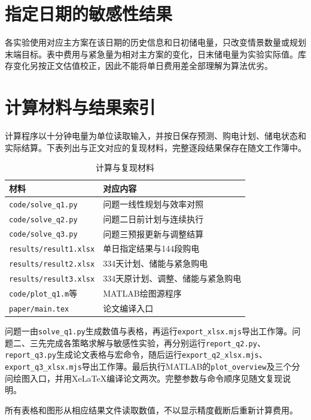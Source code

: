 \section{指定日期的敏感性结果}\label{app:sensitivity}
各实验使用对应主方案在该日期的历史信息和日初储电量，只改变情景数量或规划末端目标。表中费用与紧急量为相对主方案的变化，日末储电量为实验实际值。库存变化另按正文估值校正，因此不能将单日费用差全部理解为算法优劣。
\begin{table}[htbp]\centering\scriptsize
\caption{问题二的同起点敏感性比较}\label{tab:q2sensitivity}
\resizebox{\textwidth}{!}{}
\end{table}
\begin{table}[htbp]\centering\scriptsize
\caption{问题三的同起点敏感性比较}\label{tab:q3sensitivity}
\resizebox{\textwidth}{!}{}
\end{table}

\clearpage
\section{计算材料与结果索引}
计算程序以十分钟电量为单位读取输入，并按日保存预测、购电计划、储电状态和实际结算。下表列出与正文对应的复现材料，完整逐段结果保存在随文工作簿中。
\begin{table}[htbp]\centering\small
\caption{计算与复现材料}
\begin{tabular}{ll}\toprule
材料 & 对应内容\\\midrule
\texttt{code/solve\_q1.py} & 问题一线性规划与效率对照\\
\texttt{code/solve\_q2.py} & 问题二日前计划与连续执行\\
\texttt{code/solve\_q3.py} & 问题三预报更新与调整结算\\
\texttt{results/result1.xlsx} & 单日指定结果与144段购电\\
\texttt{results/result2.xlsx} & 334天计划、储能与紧急购电\\
\texttt{results/result3.xlsx} & 334天原计划、调整、储能与紧急购电\\
\texttt{code/plot\_q1.m}等 & MATLAB绘图源程序\\
\texttt{paper/main.tex} & 论文编译入口\\
\bottomrule\end{tabular}
\end{table}
问题一由\texttt{solve\_q1.py}生成数值与表格，再运行\texttt{export\_xlsx.mjs}导出工作簿。问题二、三先完成各策略求解与敏感性实验，再分别运行\texttt{report\_q2.py}、\texttt{report\_q3.py}生成论文表格与宏命令，随后运行\texttt{export\_q2\_xlsx.mjs}、\texttt{export\_q3\_xlsx.mjs}导出工作簿。最后执行MATLAB的\texttt{plot\_overview}及三个分问绘图入口，并用XeLaTeX编译论文两次。完整参数与命令顺序见随文复现说明。

所有表格和图形从相应结果文件读取数值，不以显示精度截断后重新计算费用。
